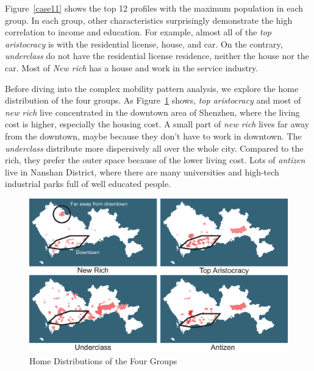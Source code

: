Figure~\ref{case11} shows the top 12 profiles with the maximum population in each group. In each group, other characteristics surprisingly demonstrate the high correlation to income and education. For example, almost all of the \textit{top aristocracy} is with the residential license,  house, and car. On the contrary, \textit{underclass} do not have the residential license residence, neither the house nor the car. Most of \textit{New rich} has a house and work in the service industry.

Before diving into the complex mobility pattern analysis, we explore the home distribution of the four groups. As Figure~\ref{case12} shows, \textit{top aristocracy} and most of \textit{new rich} live concentrated in the downtown area of Shenzhen, where the living cost is higher, especially the housing cost. A small part of \textit{new rich} lives far away from the downtown, maybe because they don't have to work in downtown. The \textit{underclass} distribute more dispersively all over the whole city. Compared to the rich, they prefer the outer space because of the lower living cost. Lots of \textit{antizen} live in Nanshan District, where there are many universities and high-tech industrial parks full of well educated people.  

\begin{figure}[htb!]
 \centering %
 \includegraphics[width=\columnwidth]{pictures/case1_2}
 \caption{Home Distributions of the Four Groups}
 \label{case12}
\end{figure}

